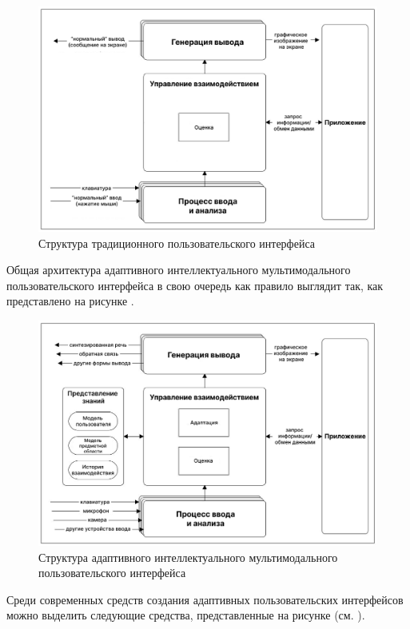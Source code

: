 \begin{figure}[H]
	\centering
	\includegraphics[scale=0.4]{author/part4/figures/traditional_ui.png}
	\caption{Структура традиционного пользовательского интерфейса}
	\label{fig:traditional_ui}
\end{figure}

Общая архитектура адаптивного интеллектуального мультимодального пользовательского интерфейса в свою очередь как правило выглядит так, как представлено на рисунке .

\begin{figure}[H]
	\centering
	\includegraphics[scale=0.4]{author/part4/figures/adaptive_ui.png}
	\caption{Структура адаптивного интеллектуального мультимодального пользовательского интерфейса}
	\label{fig:adaptive_ui}
\end{figure}

Среди современных средств создания адаптивных пользовательских интерфейсов можно выделить следующие средства, представленные на рисунке  (см. ).

